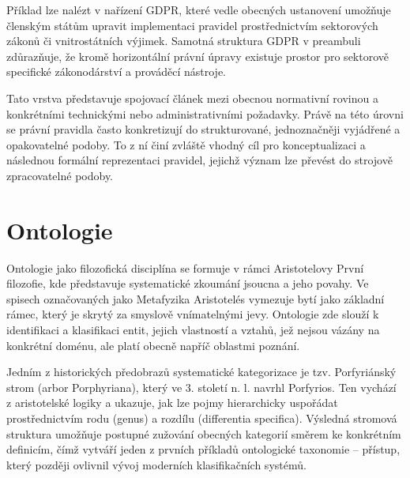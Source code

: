 Příklad lze nalézt v nařízení GDPR, které vedle obecných ustanovení umožňuje členským státům upravit implementaci pravidel prostřednictvím sektorových zákonů či vnitrostátních výjimek. Samotná struktura GDPR v preambuli zdůrazňuje, že kromě horizontální právní úpravy existuje prostor pro sektorově specifické zákonodárství a prováděcí nástroje. \cite{GDPR}

Tato vrstva představuje spojovací článek mezi obecnou normativní rovinou a konkrétními technickými nebo administrativními požadavky. Právě na této úrovni se právní pravidla často konkretizují do strukturované, jednoznačněji vyjádřené a opakovatelné podoby. To z ní činí zvláště vhodný cíl pro konceptualizaci a následnou formální reprezentaci pravidel, jejichž význam lze převést do strojově zpracovatelné podoby. \cite{Ward2009}


\section{Ontologie}
\label{sec:ontologie}
Ontologie jako filozofická disciplína se formuje v rámci Aristotelovy První filozofie, kde představuje systematické zkoumání jsoucna a jeho povahy. \cite{Smajs1994} Ve spisech označovaných jako Metafyzika Aristotelés vymezuje bytí jako základní rámec, který je skrytý za smyslově vnímatelnými jevy. Ontologie zde slouží k identifikaci a klasifikaci entit, jejich vlastností a vztahů, jež nejsou vázány na konkrétní doménu, ale platí obecně napříč oblastmi poznání. \cite{Aristoteles2021}

Jedním z historických předobrazů systematické kategorizace je tzv. Porfyriánský strom (arbor Porphyriana), který ve 3. století n. l. navrhl Porfyrios. Ten vychází z aristotelské logiky a ukazuje, jak lze pojmy hierarchicky uspořádat prostřednictvím rodu (genus) a rozdílu (differentia specifica). Výsledná stromová struktura umožňuje postupné zužování obecných kategorií směrem ke konkrétním definicím, čímž vytváří jeden z prvních příkladů ontologické taxonomie – přístup, který později ovlivnil vývoj moderních klasifikačních systémů. \cite{Arp2015}

